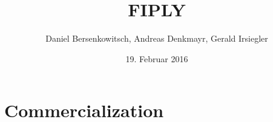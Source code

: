 \documentclass[a4paper, 12pt]{article}
\title{FIPLY}
\author{Daniel Bersenkowitsch, Andreas Denkmayr, Gerald Irsiegler}
\date{19. Februar 2016}
\begin{document}
\maketitle
\tableofcontents

\newpage


\newpage


\newpage


\newpage


\newpage


\newpage
\section{Commercialization}

\newpage

\newpage

\newpage


\newpage
\printbibliography
\end{document}
